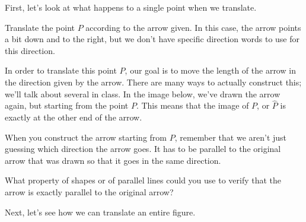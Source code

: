 \documentclass{ximera}
\begin{document}
First, let's look at what happens to a single point when we translate.
\begin{example}
Translate the point $P$ according to the arrow given. In this case, the arrow points a bit down and to the right, but we don't have specific direction words to use for this direction.
\begin{center}
\end{center}
In order to translate this point $P$, our goal is to move the length of the arrow in the direction given by the arrow. There are many ways to actually construct this; we'll talk about several in class. In the image below, we've drawn the arrow again, but starting from the point $P$. This means that the image of $P$, or $\hat{P}$ is exactly at the other end of the arrow.
\begin{center}
\end{center}
\end{example}
When you construct the arrow starting from $P$, remember that we aren't just guessing which direction the arrow goes. It has to be parallel to the original arrow that was drawn so that it goes in the same direction. 

\begin{question}
What property of shapes or of parallel lines could you use to verify that the arrow is exactly parallel to the original arrow?
\begin{multipleChoice}
\end{multipleChoice}
\end{question}


Next, let's see how we can translate an entire figure.
\end{document}
